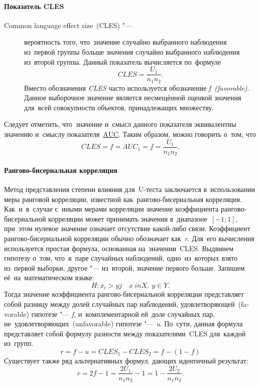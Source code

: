 \documentclass[]{scrartcl}
\begin{document}
\paragraph{Показатель CLES}
\begin{description}
		\item[Common language effect size~(CLES) "---] вероятность того, что~значение случайно выбранного наблюдения из~первой группы больше значения случайно выбранного наблюдения из~второй группы. Данный показатель вычисляется по~формуле
		\begin{equation}\label{eq:CLES}
		CLES = \frac{U_{1}}{n_{1}n_{2}}.
		\end{equation}
		Вместо обозначения \textit{CLES} часто используется обозначение \textit{f~(favorable)}. Данное выборочное значение является несмещённой оценкой значения для~всей совокупности объектов, принадлежащих множеству.
\end{description}
Следует отметить, что~значение и~смысл данного показателя эквивалентны значению и~смыслу показателя~\href{https://en.wikipedia.org/wiki/Receiver_operating_characteristic}{AUC}\cite{Wiki:ROC}. Таким образом, можно говорить о~том, что
\begin{equation}\label{eq:AUC}
CLES = f = AUC_{1} = f = \frac{U_{1}}{n_{1}n_{2}}.
\end{equation}
\paragraph{Рангово-бисериальная корреляция}
Метод представления степени влияния для~U-теста заключается в~использовании меры ранговой корреляции, известной как~рангово-бисериальная корреляция. Как~и~в~случае с~иными мерами корреляции значение коэффициента рангово-бисериальной корреляции может принимать значения в~диапазоне~${\textstyle [-1;1]}$, при~этом нулевое значение означает отсутствие какой-либо связи. Коэффициент рангово-бисериальной корреляции обычно обозначает как~\textit{r}. Для~его вычисления используется простая формула, основанная на~значении~CLES. Выдвинем гипотезу о~том, что~в~паре случайных наблюдений, одно~из~которых взято из~первой выборки, другое "--- из~второй, значение первого больше. Запишем её~на~математическом языке:
\begin{equation}\label{eq:RBC-hypothesis}
H: x_{i} > y{j} \quad x \ in X,\ y \in Y.
\end{equation} 
Тогда значение коэффициента рангово-бисериальной корреляции представляет собой разницу между долей случайных пар наблюдений, удовлетворяющей~(\foreignlanguage{english}{favorable}) гипотезе "--- \textit{f}, и~комплементарной ей~доле случайных пар, не~удовлетворяющих~(\foreignlanguage{english}{unfavorable}) гипотезе "--- \textit{u}. По~сути, данная формула представляет собой формулу разности между показателями~CLES для~каждой из~групп.
\begin{equation}\label{eq:RBC-formula-1}
r = f - u = CLES_{1} - CLES_{2} = f - (1 - f)
\end{equation}
Существует также ряд альтернативных формул, дающих идентичный результат:
\begin{equation}\label{eq:RBC-formula-2}
r = 2f -1 = \frac{2U_{1}}{n_{1}n_{2}}-1 = 1 - \frac{2U_{2}}{n_{1}n_{2}}.
\end{equation}	
\end{document}
